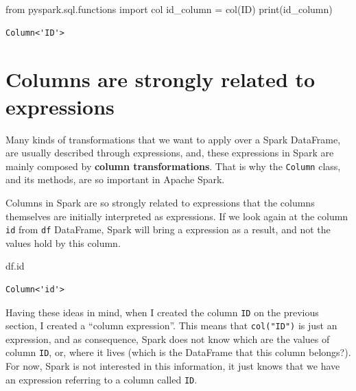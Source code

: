 \documentclass[
  11pt,
  letterpaper,
  DIV=11,
  numbers=noendperiod]{scrreprt}
\newenvironment{Shaded}{\begin{snugshade}}{\end{snugshade}}
\newcommand{\BuiltInTok}[1]{\textcolor[rgb]{0.00,0.23,0.31}{#1}}
\newcommand{\ImportTok}[1]{\textcolor[rgb]{0.00,0.46,0.62}{#1}}
\newcommand{\NormalTok}[1]{\textcolor[rgb]{0.00,0.23,0.31}{#1}}
\newcommand{\OperatorTok}[1]{\textcolor[rgb]{0.37,0.37,0.37}{#1}}
\newcommand{\StringTok}[1]{\textcolor[rgb]{0.13,0.47,0.30}{#1}}
\begin{document}
\begin{Shaded}
\begin{Highlighting}[]
\ImportTok{from}\NormalTok{ pyspark.sql.functions }\ImportTok{import}\NormalTok{ col}
\NormalTok{id\_column }\OperatorTok{=}\NormalTok{ col(}\StringTok{\textquotesingle{}ID\textquotesingle{}}\NormalTok{)}
\BuiltInTok{print}\NormalTok{(id\_column)}
\end{Highlighting}
\end{Shaded}

\begin{verbatim}
Column<'ID'>
\end{verbatim}

\hypertarget{sec-columns-related-expressions}{%
\section{Columns are strongly related to
expressions}\label{sec-columns-related-expressions}}

Many kinds of transformations that we want to apply over a Spark
DataFrame, are usually described through expressions, and, these
expressions in Spark are mainly composed by \textbf{column
transformations}. That is why the \texttt{Column} class, and its
methods, are so important in Apache Spark.

Columns in Spark are so strongly related to expressions that the columns
themselves are initially interpreted as expressions. If we look again at
the column \texttt{id} from \texttt{df} DataFrame, Spark will bring a
expression as a result, and not the values hold by this column.

\begin{Shaded}
\begin{Highlighting}[]
\NormalTok{df.}\BuiltInTok{id}
\end{Highlighting}
\end{Shaded}

\begin{verbatim}
Column<'id'>
\end{verbatim}

Having these ideas in mind, when I created the column \texttt{ID} on the
previous section, I created a ``column expression''. This means that
\texttt{col("ID")} is just an expression, and as consequence, Spark does
not know which are the values of column \texttt{ID}, or, where it lives
(which is the DataFrame that this column belongs?). For now, Spark is
not interested in this information, it just knows that we have an
expression referring to a column called \texttt{ID}.
\end{document}
